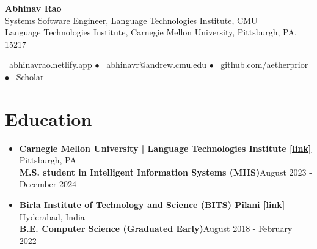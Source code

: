 \documentclass[11pt,letterpaper]{article}
\begin{document}
    
    \begin{center}
        {\Huge\bfseries Abhinav Rao}\\[2mm]
        {\large Systems Software Engineer, Language Technologies Institute, CMU}\\[1mm]
        {\small Language Technologies Institute, Carnegie Mellon University,
            Pittsburgh, PA, 15217}
    \end{center}
    
    \begin{center}
    \href{https://abhinavrao.netlify.app}{\faGlobe\ abhinavrao.netlify.app} $\bullet$ \href{mailto:abhinavr@andrew.cmu.edu}{\faEnvelope\ abhinavr@andrew.cmu.edu} $\bullet$ \href{https://github.com/aetherprior}{\faGithub\ github.com/aetherprior} $\bullet$ \href{https://scholar.google.com/citations?user=U_wk4ssAAAAJ}{\faGraduationCap\ Scholar}
    \end{center}
    
    \section*{Education}
    \begin{itemize}[leftmargin=*,label={},itemsep=4pt]
        \item \textbf{Carnegie Mellon University | Language Technologies Institute  \href{https://lti.cs.cmu.edu}{[link]}} \hfill Pittsburgh, PA\\
        \textbf{ M.S. student in Intelligent
                    Information Systems (MIIS)}\hfill August 2023 - December 2024\
            
        \item \textbf{Birla Institute of Technology and Science (BITS) Pilani  \href{https://www.bits-pilani.ac.in/hyderabad/}{[link]}} \hfill Hyderabad, India\\
        \textbf{ B.E. Computer Science (Graduated
                    Early)}\hfill August 2018 - February 2022\
            
    \end{itemize}
    
\end{document}
